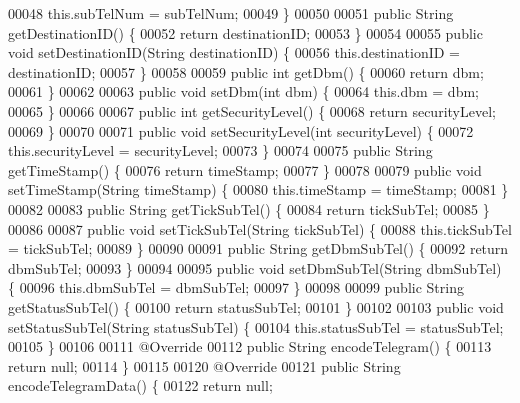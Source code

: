 \begin{DoxyCode}
00048         this.subTelNum = subTelNum;
00049     \}
00050 
00051     \textcolor{keyword}{public} String getDestinationID() \{
00052         \textcolor{keywordflow}{return} destinationID;
00053     \}
00054 
00055     \textcolor{keyword}{public} \textcolor{keywordtype}{void} setDestinationID(String destinationID) \{
00056         this.destinationID = destinationID;
00057     \}
00058 
00059     \textcolor{keyword}{public} \textcolor{keywordtype}{int} getDbm() \{
00060         \textcolor{keywordflow}{return} dbm;
00061     \}
00062 
00063     \textcolor{keyword}{public} \textcolor{keywordtype}{void} setDbm(\textcolor{keywordtype}{int} dbm) \{
00064         this.dbm = dbm;
00065     \}
00066 
00067     \textcolor{keyword}{public} \textcolor{keywordtype}{int} getSecurityLevel() \{
00068         \textcolor{keywordflow}{return} securityLevel;
00069     \}
00070 
00071     \textcolor{keyword}{public} \textcolor{keywordtype}{void} setSecurityLevel(\textcolor{keywordtype}{int} securityLevel) \{
00072         this.securityLevel = securityLevel;
00073     \}
00074 
00075     \textcolor{keyword}{public} String getTimeStamp() \{
00076         \textcolor{keywordflow}{return} timeStamp;
00077     \}
00078 
00079     \textcolor{keyword}{public} \textcolor{keywordtype}{void} setTimeStamp(String timeStamp) \{
00080         this.timeStamp = timeStamp;
00081     \}
00082 
00083     \textcolor{keyword}{public} String getTickSubTel() \{
00084         \textcolor{keywordflow}{return} tickSubTel;
00085     \}
00086 
00087     \textcolor{keyword}{public} \textcolor{keywordtype}{void} setTickSubTel(String tickSubTel) \{
00088         this.tickSubTel = tickSubTel;
00089     \}
00090 
00091     \textcolor{keyword}{public} String getDbmSubTel() \{
00092         \textcolor{keywordflow}{return} dbmSubTel;
00093     \}
00094 
00095     \textcolor{keyword}{public} \textcolor{keywordtype}{void} setDbmSubTel(String dbmSubTel) \{
00096         this.dbmSubTel = dbmSubTel;
00097     \}
00098 
00099     \textcolor{keyword}{public} String getStatusSubTel() \{
00100         \textcolor{keywordflow}{return} statusSubTel;
00101     \}
00102 
00103     \textcolor{keyword}{public} \textcolor{keywordtype}{void} setStatusSubTel(String statusSubTel) \{
00104         this.statusSubTel = statusSubTel;
00105     \}
00106 
00111     @Override
00112     \textcolor{keyword}{public} String encodeTelegram() \{
00113         \textcolor{keywordflow}{return} null;
00114     \}
00115 
00120     @Override
00121     \textcolor{keyword}{public} String encodeTelegramData() \{
00122         \textcolor{keywordflow}{return} null;

\end{DoxyCode}
